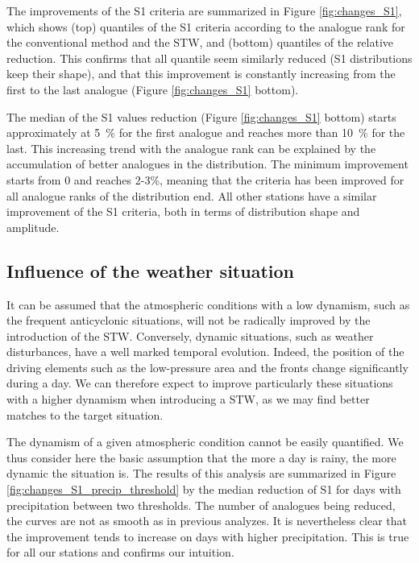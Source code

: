 \documentclass[hess]{copernicus}
\begin{document}
The improvements of the S1 criteria are summarized in Figure \ref{fig:changes_S1}, which shows (top) quantiles of the S1 criteria according to the analogue rank for the conventional method and the STW, and (bottom) quantiles of the relative reduction. This confirms that all quantile seem similarly reduced (S1 distributions keep their shape), and that this improvement is constantly increasing from the first to the last analogue (Figure \ref{fig:changes_S1} bottom).

The median of the S1 values reduction (Figure \ref{fig:changes_S1} bottom) starts approximately at 5~\% for the first analogue and reaches more than 10~\% for the last. This increasing trend with the analogue rank can be explained by the accumulation of better analogues in the distribution. The minimum improvement starts from 0 and reaches 2-3\%, meaning that the criteria has been improved for all analogue ranks of the distribution end. All other stations have a similar improvement of the S1 criteria, both in terms of distribution shape and amplitude.


\subsection{Influence of the weather situation}
\label{sec:influence_precip}

It can be assumed that the atmospheric conditions with a low dynamism, such as the frequent anticyclonic situations, will not be radically improved by the introduction of the STW. Conversely, dynamic situations, such as weather disturbances, have a well marked temporal evolution. Indeed, the position of the driving elements such as the low-pressure area and the fronts change significantly during a day. We can therefore expect to improve particularly these situations with a higher dynamism when introducing a STW, as we may find better matches to the target situation.

The dynamism of a given atmospheric condition cannot be easily quantified. We thus consider here the basic assumption that the more a day is rainy, the more dynamic the situation is. The results of this analysis are summarized in Figure \ref{fig:changes_S1_precip_threshold} by the median reduction of S1 for days with precipitation between two thresholds. The number of analogues being reduced, the curves are not as smooth as in previous analyzes. It is nevertheless clear that the improvement tends to increase on days with higher precipitation. This is true for all our stations and confirms our intuition.
\end{document}
